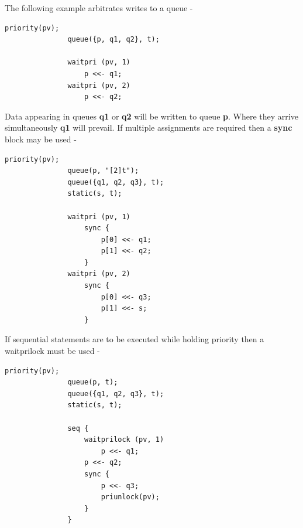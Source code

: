         The following example arbitrates writes to a queue -
        \begin{lstlisting}[gobble=8, language=threepl]
               priority(pv);
               queue({p, q1, q2}, t);
               
               waitpri (pv, 1)
                   p <<- q1;
               waitpri (pv, 2)
                   p <<- q2;
        \end{lstlisting}
        Data appearing in queues {\bf q1} or {\bf q2} will be written to
        queue {\bf p}. Where they arrive simultaneously {\bf q1} will prevail.
        If multiple assignments are required then a {\bf sync} block may be used -
        \begin{lstlisting}[gobble=8, language=threepl]
               priority(pv);
               queue(p, "[2]t");
               queue({q1, q2, q3}, t);
               static(s, t);

               waitpri (pv, 1)
                   sync {
                       p[0] <<- q1;
                       p[1] <<- q2;
                   }
               waitpri (pv, 2)
                   sync {
                       p[0] <<- q3;
                       p[1] <<- s;
                   }
        \end{lstlisting}
        If sequential statements are to be executed while holding
        priority then a waitprilock must be used -
        \begin{lstlisting}[gobble=8, language=threepl]
               priority(pv);
               queue(p, t);
               queue({q1, q2, q3}, t);
               static(s, t);

               seq {
                   waitprilock (pv, 1)
                       p <<- q1;
                   p <<- q2;
                   sync {
                       p <<- q3;
                       priunlock(pv);
                   }
               }
        \end{lstlisting}
        
